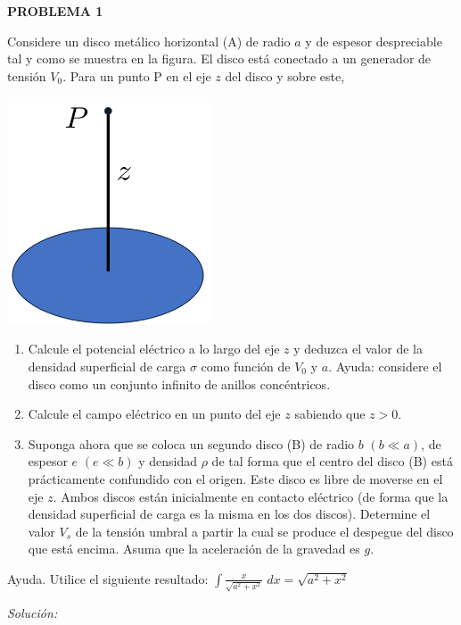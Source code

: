 \textbf{PROBLEMA 1}
\vspace{20px}

Considere un disco metálico horizontal (A) de radio $a$ y de espesor despreciable tal y como se muestra en
la figura. El disco está conectado a un generador de tensión $V_0$. Para un punto P en el eje $z$ del disco y sobre
este,

\begin{center}
    \includegraphics[width=6cm]{files/img1}
\end{center}

\begin{enumerate}[label=\alph*.]
    \item Calcule el potencial eléctrico a lo largo del eje $z$ y deduzca el valor de la densidad superficial de carga $\sigma$
    como función de $V_0$ y $a$. Ayuda: considere el disco como un conjunto infinito de anillos concéntricos.
    \item Calcule el campo eléctrico en un punto del eje $z$ sabiendo que $z > 0$.
    \item Suponga ahora que se coloca un segundo disco (B) de radio $b$ $(b \ll a)$, de espesor $e$ $(e \ll b)$ y densidad $\rho$
    de tal forma que el centro del disco (B) está prácticamente confundido con el origen. Este disco es libre
    de moverse en el eje $z$. Ambos discos están inicialmente en contacto eléctrico (de forma que la densidad
    superficial de carga es la misma en los dos discos). Determine el valor $V_s$ de la tensión umbral a partir la
    cual se produce el despegue del disco que está encima. Asuma que la aceleración de la gravedad es $g$.
\end{enumerate}

Ayuda. Utilice el siguiente resultado: $\int \frac{x}{\sqrt{a^2 + x^2}}\;dx = \sqrt {a^2 + x^2}$

\vspace{20px}
\textit{Solución:}
\\